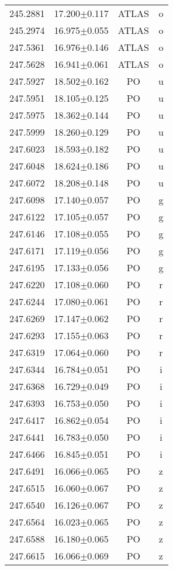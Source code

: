 \begin{table}
\begin{tabular}{cccc}
245.2881 & 17.200$\pm$0.117 & ATLAS & o \\
245.2974 & 16.975$\pm$0.055 & ATLAS & o \\
247.5361 & 16.976$\pm$0.146 & ATLAS & o \\
247.5628 & 16.941$\pm$0.061 & ATLAS & o \\
247.5927 & 18.502$\pm$0.162 & PO & u \\
247.5951 & 18.105$\pm$0.125 & PO & u \\
247.5975 & 18.362$\pm$0.144 & PO & u \\
247.5999 & 18.260$\pm$0.129 & PO & u \\
247.6023 & 18.593$\pm$0.182 & PO & u \\
247.6048 & 18.624$\pm$0.186 & PO & u \\
247.6072 & 18.208$\pm$0.148 & PO & u \\
247.6098 & 17.140$\pm$0.057 & PO & g \\
247.6122 & 17.105$\pm$0.057 & PO & g \\
247.6146 & 17.108$\pm$0.055 & PO & g \\
247.6171 & 17.119$\pm$0.056 & PO & g \\
247.6195 & 17.133$\pm$0.056 & PO & g \\
247.6220 & 17.108$\pm$0.060 & PO & r \\
247.6244 & 17.080$\pm$0.061 & PO & r \\
247.6269 & 17.147$\pm$0.062 & PO & r \\
247.6293 & 17.155$\pm$0.063 & PO & r \\
247.6319 & 17.064$\pm$0.060 & PO & r \\
247.6344 & 16.784$\pm$0.051 & PO & i \\
247.6368 & 16.729$\pm$0.049 & PO & i \\
247.6393 & 16.753$\pm$0.050 & PO & i \\
247.6417 & 16.862$\pm$0.054 & PO & i \\
247.6441 & 16.783$\pm$0.050 & PO & i \\
247.6466 & 16.845$\pm$0.051 & PO & i \\
247.6491 & 16.066$\pm$0.065 & PO & z \\
247.6515 & 16.060$\pm$0.067 & PO & z \\
247.6540 & 16.126$\pm$0.067 & PO & z \\
247.6564 & 16.023$\pm$0.065 & PO & z \\
247.6588 & 16.180$\pm$0.065 & PO & z \\
247.6615 & 16.066$\pm$0.069 & PO & z \\

\end{tabular}
\end{table}
